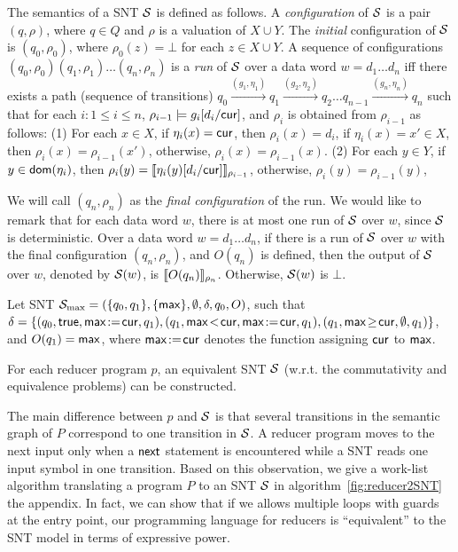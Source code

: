 The semantics of a SNT ${\mathcal{S} }$  is defined as follows. A \emph{configuration} of ${\mathcal{S} }$ is a pair $(q,\rho)$, where $q \in Q$ and $\rho$ is a valuation of $X \cup Y$. The \emph{initial} configuration of ${\mathcal{S} }$ is $(q_0,\rho_0)$, where $\rho_0(z)=\bot$ for each $z \in X\cup Y$.
A sequence of configurations $(q_0,\rho_0)(q_1,\rho_1)\ldots(q_n,\rho_n)$ is
a \emph{run} of ${\mathcal{S} }$ over a data word $w=d_1 \dots d_n$ iff there exists a path (sequence of transitions) $q_0 \xrightarrow{(g_1,\eta_1)} q_1 \xrightarrow{(g_2,\eta_2)} q_2 \dots q_{n-1} \xrightarrow{(g_n, \eta_n)} q_n$ such that for each $i: 1 \le i \le n$, $\rho_{i-1} \models g_i[d_i/\mathsf{cur}]$, and $\rho_i$ is obtained from $\rho_{i-1}$ as follows: (1) For each $x \in X$, if $\eta_i(x)=\mathsf{cur}$, then $\rho_i(x)=d_i$,  if $\eta_i(x)=x' \in X$, then $\rho_i(x)=\rho_{i-1}(x')$, otherwise, $\rho_i(x)=\rho_{i-1}(x)$. (2) For each $y \in Y$, if $y \in \mathsf{dom}(\eta_i)$, then $\rho_i(y)=\llbracket\eta_i(y)[d_i/\mathsf{cur}]\rrbracket_{\rho_{i-1}}$, otherwise, $\rho_i(y)=\rho_{i-1}(y)$,

We will call $(q_n,\rho_n)$ as the \emph{final configuration} of the run.
We would like to remark that for each data word $w$, there is at most one run of ${\mathcal{S} }$ over $w$, since ${\mathcal{S} }$ is deterministic. 
Over a data word $w = d_1 \dots d_n$, if there is a run of ${\mathcal{S} }$ over $w$ with the final configuration $(q_n,\rho_n)$, and $O(q_n)$ is defined, then the output of ${\mathcal{S} }$ over $w$, denoted by ${{\mathcal{S} }}(w)$, is $\llbracket O(q_n)\rrbracket_{\rho_n}$. Otherwise, ${{\mathcal{S} }}(w)$ is $\bot$.

\begin{example}
Let SNT ${\mathcal{S} }_{\max}=(\{q_0,q_1\}, \{\mathsf{max}\}, \emptyset, \delta, q_0, O)$, such that $\delta = \{(q_0, \ltrue, \maxv\!:=\!\cur, q_1), (q_1, \maxv\!<\!\cur, \maxv\!:=\!\cur,q_1), (q_1, \maxv \!\ge\! \cur, \emptyset, q_1)\}$, and $O(q_1)=\mathsf{max}$, where $\mathsf{max}\!:=\!\mathsf{cur}$ denotes the function assigning $\mathsf{cur}$ to $\mathsf{max}$.
\end{example}
\begin{proposition}\label{prop-mrprog-to-snt}
For each reducer program $p$, an equivalent SNT ${\mathcal{S} }$ (w.r.t. the commutativity and equivalence problems) can be constructed.
\end{proposition}
The main difference between $p$ and ${\mathcal{S} }$ is that several transitions in the semantic graph of $P$ correspond to one transition in ${\mathcal{S} }$. A reducer program moves to the next input only when a $\mathsf{next}$ statement is encountered while a SNT reads one input symbol in one transition. Based on this observation, we give a work-list algorithm translating a program $P$ to an SNT ${\mathcal{S} }$ in algorithm~\ref{fig:reducer2SNT} the appendix.
In fact, we can show that if we allows multiple loops with guards at the entry point, our programming language for reducers is ``equivalent'' to the SNT model in terms of expressive power.

